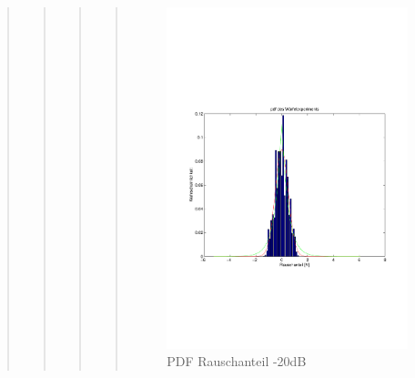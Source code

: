 \begin{quote}
\begin{quote}
\begin{quote}
\begin{quote}
		\begin{figure}[H]
        \centering
            \includegraphics[scale=0.6, trim = 1cm 6.5cm 1cm 7.5cm, clip]{./Bilder/PDFRauschen-20dB}
                \caption{PDF Rauschanteil -20dB}
        \end{figure}
        

\end{quote}
\end{quote}
\end{quote}
\end{quote}
